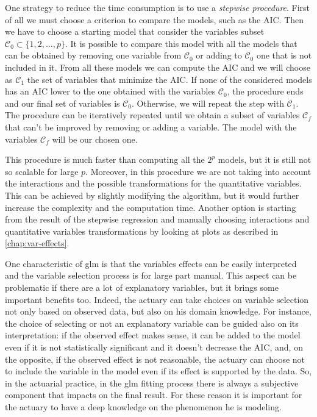 \documentclass[a4paper, twoside, openright, 12pt]{report}
\theoremstyle{definition}
\theoremstyle{definition}
\theoremstyle{definition}
\theoremstyle{remark}
\begin{document}
One strategy to reduce the time consumption is to use a \emph{stepwise procedure}. First of all we must choose a criterion to compare the models, such as the AIC. Then we have to choose a starting model that consider the variables subset \(\mathcal{C}_0 \subset \{ 1,2,\dots,p \}\). It is possible to compare this model with all the models that can be obtained by removing one variable from \(\mathcal{C}_0\) or adding to \(\mathcal{C}_0\) one that is not included in it. From all these models we can compute the AIC and we will choose as \(\mathcal{C}_1\) the set of variables that minimize the AIC. If none of the considered models has an AIC lower to the one obtained with the variables \(\mathcal{C}_0\), the procedure ends and our final set of variables is \(\mathcal{C}_0\). Otherwise, we will repeat the step with \(\mathcal{C}_1\). The procedure can be iteratively repeated until we obtain a subset of variables \(\mathcal{C}_f\) that can't be improved by removing or adding a variable. The model with the variables \(\mathcal{C}_f\) will be our chosen one.

This procedure is much faster than computing all the \(2^p\) models, but it is still not so scalable for large \(p\). Moreover, in this procedure we are not taking into account the interactions and the possible transformations for the quantitative variables. This can be achieved by slightly modifying the algorithm, but it would further increase the complexity and the computation time. Another option is starting from the result of the stepwise regression and manually choosing interactions and quantitative variables transformations by looking at plots as described in \ref{chap:var-effects}.

One characteristic of \ac{glm} is that the variables effects can be easily interpreted and the variable selection process is for large part manual. This aspect can be problematic if there are a lot of explanatory variables, but it brings some important benefits too. Indeed, the actuary can take choices on variable selection not only based on observed data, but also on his domain knowledge. For instance, the choice of selecting or not an explanatory variable can be guided also on its interpretation: if the observed effect makes sense, it can be added to the model even if it is not statistically significant and it doesn't decrease the AIC, and, on the opposite, if the observed effect is not reasonable, the actuary can choose not to include the variable in the model even if its effect is supported by the data. So, in the actuarial practice, in the \ac{glm} fitting process there is always a subjective component that impacts on the final result. For these reason it is important for the actuary to have a deep knowledge on the phenomenon he is modeling.
\end{document}
